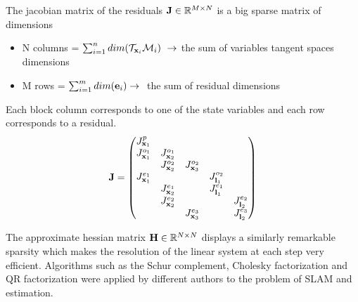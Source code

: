 The jacobian matrix of the residuals ${\bf J} \in \mathbb{R}^{M \times N}$ is a big sparse matrix of dimensions 
\begin{itemize}
    \item N columns = $\sum_{i=1}^{n}dim(\mathcal{T}_{{\bf x}_i}\mathcal{M}_i)~\rightarrow$ the sum of variables tangent spaces dimensions 
    \item M rows = $\sum_{i=1}^{m}dim({\bf e}_i) \rightarrow~$ the sum of residual dimensions
\end{itemize}   

Each block column corresponds to one of the state variables and each row corresponds to a residual.
\begin{equation}
    {\bf J}=
    \begin{pmatrix}
       J^{p}_{{\bf x}_1} &   &     &     &     \\
       J^{o_1}_{{\bf x}_1} & J^{o_1}_{{\bf x}_2}  &     &     &     \\
                       & J^{o_2}_{{\bf x}_2}  & J^{o_2}_{{\bf x}_3}   &     &     \\
       J^{e_1}_{{\bf x}_1} &                  &     &  J^{o_2}_{{\bf l}_1}   &     \\
                       & J^{e_1}_{{\bf x}_2}  &     &  J^{e_1}_{{\bf l}_1}   &     \\
                       & J^{e_2}_{{\bf x}_2}  &     &     &  J^{e_2}_{{\bf l}_2}   \\
                       &                  & J^{e_3}_{{\bf x}_3}    &     &  J^{e_3}_{{\bf l}_2}   \\
    \end{pmatrix}
    \label{eq:sparse_jac}
\end{equation}

The approximate hessian matrix ${\bf H} \in \mathbb{R}^{N \times N}$ displays a similarly remarkable sparsity which makes the resolution of the linear system
at each step very efficient. Algorithms such as the Schur complement, Cholesky factorization and QR factorization were applied by different authors to the 
problem of SLAM and estimation.








